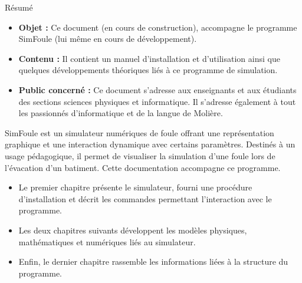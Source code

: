\begin{center}
\Large
Résumé
\normalsize
\end{center}
\vspace{3cm}
\begin{itemize}[leftmargin=1cm, label=, itemsep=21pt]
\item {\bf Objet : }Ce document (en cours de construction), accompagne le programme SimFoule (lui même en cours de développement).
\item {\bf Contenu : }Il contient un manuel d'installation et d'utilisation ainsi que quelques développements théoriques liés à ce programme de simulation.
\item {\bf Public concerné : }Ce document s'adresse aux enseignants et aux étudiants des sections sciences physiques et informatique. Il s'adresse également à tout les passionnés d'informatique et de la langue de Molière.
\end{itemize}

\vspace{3cm}

SimFoule est un simulateur numériques de foule offrant une représentation graphique et une interaction dynamique avec certains paramètres. Destinés à un usage pédagogique, il permet de visualiser la simulation d'une foule lors de l'évacation d'un batiment. Cette documentation accompagne ce programme.

\begin{itemize}[leftmargin=1cm, label=, itemsep=11pt]
\item Le premier chapitre présente le simulateur, fourni une procédure d'installation et décrit les commandes permettant l'interaction avec le programme.
\item Les deux chapitres suivants développent les modèles physiques, mathématiques et numériques liés au simulateur.
\item Enfin, le dernier chapitre rassemble les informations liées à la structure du programme.
\end{itemize}
